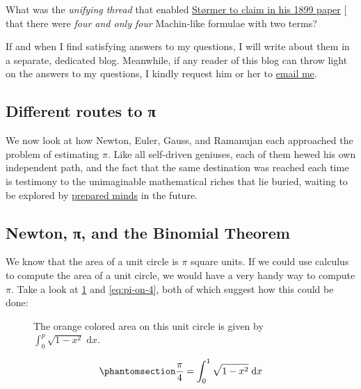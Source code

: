 \documentclass[
  a4paper,
]{article}
\begin{document}
What was the \emph{unifying thread} that enabled
\href{http://www.numdam.org/articles/10.24033/bsmf.603/}{Størmer to
claim in his 1899 paper} {[}\citeproc{ref-stormer-1899}{26}{]} that
there were \emph{four and only four} Machin-like formulae with two
terms?

If and when I find satisfying answers to my questions, I will write
about them in a separate, dedicated blog. Meanwhile, if any reader of
this blog can throw light on the answers to my questions, I kindly
request him or her to \href{mailto:feedback.swanlotus@gmail.com}{email
me}.

\subsection{Different routes to π}\label{different-routes-to-ux3c0}

We now look at how Newton, Euler, Gauss, and Ramanujan each approached
the problem of estimating \(\pi\). Like all self-driven geniuses, each
of them hewed his own independent path, and the fact that the same
destination was reached each time is testimony to the unimaginable
mathematical riches that lie buried, waiting to be explored by
\href{https://www.pasteurbrewing.com/louis-pasteur-chance-favors-the-prepared-mind/}{prepared
minds} in the future.

\subsection{Newton, π, and the Binomial
Theorem}\label{newton-ux3c0-and-the-binomial-theorem}

We know that the area of a unit circle is \(\pi\) square units. If we
could use calculus to compute the area of a unit circle, we would have a
very handy way to compute \(\pi\). Take a look at \cref{fig:quadrant}
and \cref{eq:pi-on-4}, both of which suggest how this could be done:

\begin{figure}
\centering

\caption{The orange colored area on this unit circle is given by
\(\displaystyle\int_0^p\sqrt{1-x^2}\;\mathrm{d}x\).}\label{fig:quadrant}
\end{figure}

\begin{equation}\phantomsection\label{eq:pi-on-4}{
\frac{\pi}{4} = \displaystyle\int_0^1\sqrt{1-x^2}\;\mathrm{d}x
}\end{equation}
\end{document}
